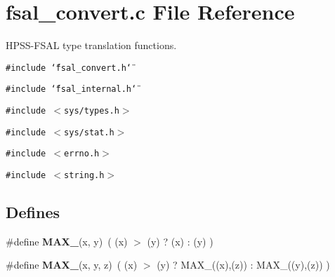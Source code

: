 \section{fsal\_\-convert.c File Reference}
\label{fsal__convert_8c}
HPSS-FSAL type translation functions.  


{\tt \#include \char`\"{}fsal\_\-convert.h\char`\"{}}\par
{\tt \#include \char`\"{}fsal\_\-internal.h\char`\"{}}\par
{\tt \#include $<$sys/types.h$>$}\par
{\tt \#include $<$sys/stat.h$>$}\par
{\tt \#include $<$errno.h$>$}\par
{\tt \#include $<$string.h$>$}\par
\subsection*{Defines}
\begin{CompactItemize}
\item 
\#define \textbf{MAX\_}(x, y)~( (x) $>$ (y) ? (x) : (y) )\label{fsal__convert_8c_29bc465820d0719bc24cb339e75806d0}

\item 
\#define \textbf{MAX\_}(x, y, z)~( (x) $>$ (y) ? MAX\_((x),(z)) : MAX\_((y),(z)) )\label{fsal__convert_8c_e28623bae2af7d233caa8038601aa853}

\end{CompactItemize}
